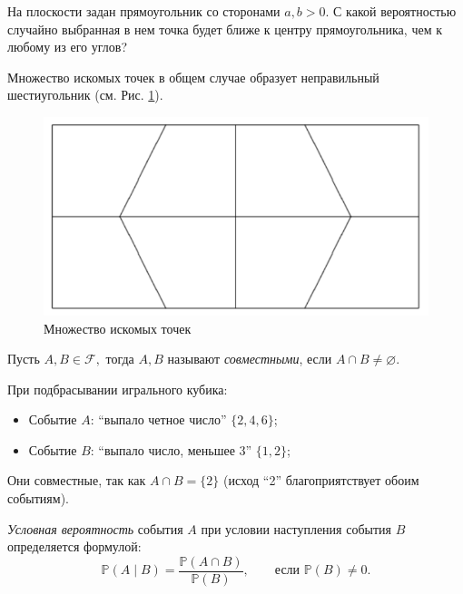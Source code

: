 \documentclass[12pt,a4paper]{article}
\begin{document}
\begin{example}
    На плоскости задан прямоугольник со сторонами $a, b > 0$. С какой вероятностью случайно выбранная в нем точка будет ближе к центру прямоугольника, чем к любому из его углов?
\end{example}
\begin{solution}
    Множество искомых точек в общем случае образует неправильный шестиугольник (см. Рис. \ref{fig:ex1}).
\end{solution}

\begin{figure}[h]
    \centering
    \includegraphics[scale=0.3]{images/ex1.png}
    \caption{Множество искомых точек}
    \label{fig:ex1}
\end{figure}

\begin{definition}
    Пусть $A, B \in \mathcal{F},$ тогда $A, B$ называют \textit{совместными}, если $A \cap B \neq \varnothing$.
\end{definition}

\begin{example}
При подбрасывании игрального кубика:
\begin{itemize}
    \item Событие $A$: ``выпало четное число'' $\{2, 4, 6\}$;
    \item Событие $B$: ``выпало число, меньшее 3'' $\{1, 2\}$;
\end{itemize}
Они совместные, так как $A \cap B = \{2\}$ (исход ``2'' благоприятствует обоим событиям).
\end{example}

\begin{definition}
    \textit{Условная вероятность} события $A$ при условии наступления события $B$ определяется формулой: $$\mathbb{P}\left( A \mid B \right) = \frac{\mathbb{P}\left( A \cap B \right)}{\mathbb{P}\left( B \right)}, \qquad \text{если } \mathbb{P}\left(B\right) \neq 0.$$
\end{definition}
\end{document}
